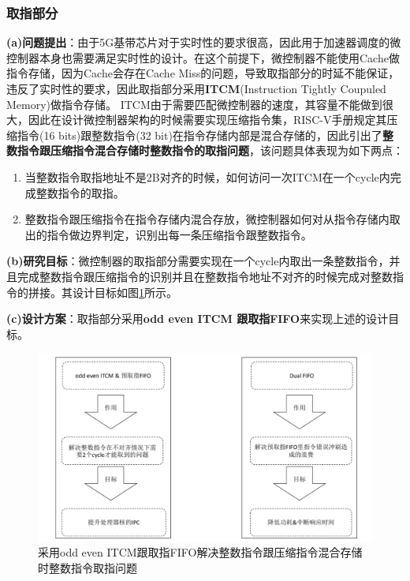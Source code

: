 \documentclass[a4paper, 12pt]{article}
\begin{document}
\subsubsection{取指部分}
\textbf{(a)问题提出}：由于5G基带芯片对于实时性的要求很高\cite{kim2020flexible}，因此用于加速器调度的微控制器本身也需要满足实时性的设计。在这个前提下，微控制器不能使用Cache做指令存储，因为Cache会存在Cache Miss的问题\cite{duran2020energy}，导致取指部分的时延不能保证，违反了实时性的要求，因此取指部分采用\textbf{ITCM}(Instruction Tightly Coupuled Memory)做指令存储。
ITCM由于需要匹配微控制器的速度，其容量不能做到很大，因此在设计微控制器架构的时候需要实现压缩指令集\cite{tabanelli2022optimizing}，RISC-V手册规定其压缩指令(16 bits)跟整数指令(32 bit)在指令存储内部是混合存储的\cite{balas2021risc}，因此引出了\textbf{整数指令跟压缩指令混合存储时整数指令的取指问题}\cite{scheipel2022moremcu}，该问题具体表现为如下两点：
\begin{enumerate}
  \item 当整数指令取指地址不是2B对齐的时候，如何访问一次ITCM在一个cycle内完成整数指令的取指。
  \item 整数指令跟压缩指令在指令存储内混合存放，微控制器如何对从指令存储内取出的指令做边界判定，识别出每一条压缩指令跟整数指令。
\end{enumerate}

\textbf{(b)研究目标}：微控制器的取指部分需要实现在一个cycle内取出一条整数指令，并且完成整数指令跟压缩指令的识别并且在整数指令地址不对齐的时候完成对整数指令的拼接。其设计目标如图\ref{fig:if_design_features}所示。

\textbf{(c)设计方案}：取指部分采用\textbf{odd even ITCM 跟取指FIFO}来实现上述的设计目标。
\begin{figure}
  \centering
  \includegraphics[width=0.8\linewidth]{./images/if_design_features.pdf}
  \caption{采用odd even ITCM跟取指FIFO解决整数指令跟压缩指令混合存储时整数指令取指问题}
  \label{fig:if_design_features}
\end{figure}
\end{document}
